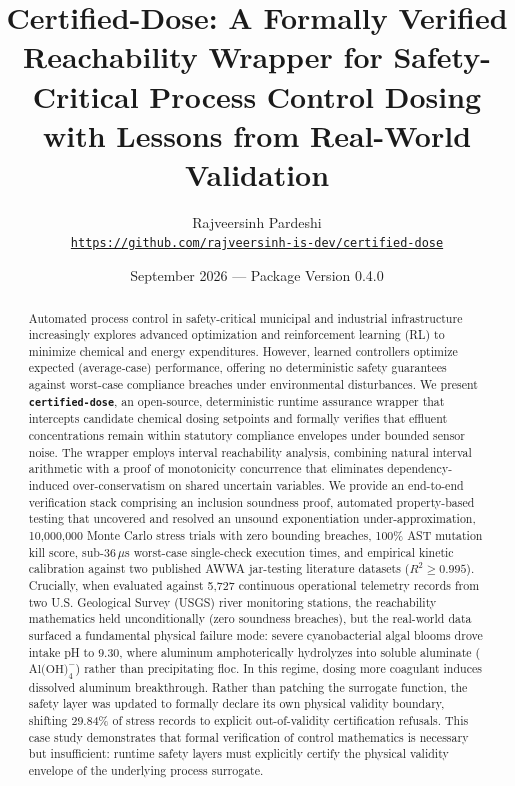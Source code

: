 \documentclass[10pt,twocolumn,letterpaper]{article}
\title{\textbf{Certified-Dose: A Formally Verified Reachability Wrapper for Safety-Critical Process Control Dosing with Lessons from Real-World Validation}}
\author{Rajveersinh Pardeshi \\
  \small \texttt{\url{https://github.com/rajveersinh-is-dev/certified-dose}}
}
\date{September 2026 --- Package Version 0.4.0}
\theoremstyle{definition}
\begin{document}
\maketitle

\begin{abstract}
Automated process control in safety-critical municipal and industrial infrastructure increasingly explores advanced optimization and reinforcement learning (RL) to minimize chemical and energy expenditures. However, learned controllers optimize expected (average-case) performance, offering no deterministic safety guarantees against worst-case compliance breaches under environmental disturbances. We present \textbf{\texttt{certified-dose}}, an open-source, deterministic runtime assurance wrapper that intercepts candidate chemical dosing setpoints and formally verifies that effluent concentrations remain within statutory compliance envelopes under bounded sensor noise. The wrapper employs interval reachability analysis, combining natural interval arithmetic with a proof of monotonicity concurrence that eliminates dependency-induced over-conservatism on shared uncertain variables. We provide an end-to-end verification stack comprising an inclusion soundness proof, automated property-based testing that uncovered and resolved an unsound exponentiation under-approximation, 10,000,000 Monte Carlo stress trials with zero bounding breaches, 100\% AST mutation kill score, sub-36\,$\mu$s worst-case single-check execution times, and empirical kinetic calibration against two published AWWA jar-testing literature datasets ($R^2 \ge 0.995$). Crucially, when evaluated against 5,727 continuous operational telemetry records from two U.S. Geological Survey (USGS) river monitoring stations, the reachability mathematics held unconditionally (zero soundness breaches), but the real-world data surfaced a fundamental physical failure mode: severe cyanobacterial algal blooms drove intake pH to 9.30, where aluminum amphoterically hydrolyzes into soluble aluminate ($\text{Al(OH)}_4^-$) rather than precipitating floc. In this regime, dosing more coagulant induces dissolved aluminum breakthrough. Rather than patching the surrogate function, the safety layer was updated to formally declare its own physical validity boundary, shifting 29.84\% of stress records to explicit out-of-validity certification refusals. This case study demonstrates that formal verification of control mathematics is necessary but insufficient: runtime safety layers must explicitly certify the physical validity envelope of the underlying process surrogate.
\end{abstract}
\end{document}

